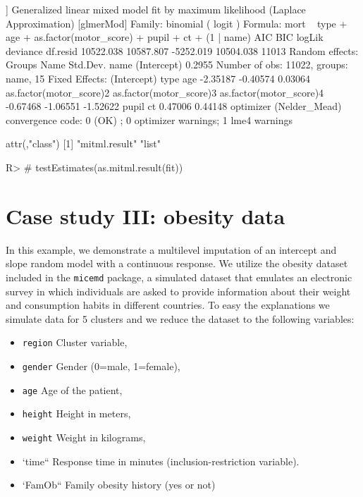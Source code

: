 \documentclass[
]{jss}
\providecommand{\tightlist}{%
  \setlength{\itemsep}{0pt}\setlength{\parskip}{0pt}}
\begin{document}
\begin{CodeChunk}
\begin{CodeOutput}
[[5]]
Generalized linear mixed model fit by maximum likelihood (Laplace
  Approximation) [glmerMod]
 Family: binomial  ( logit )
Formula: mort ~ type + age + as.factor(motor_score) + pupil + ct + (1 |  
    name)
      AIC       BIC    logLik  deviance  df.resid 
10522.038 10587.807 -5252.019 10504.038     11013 
Random effects:
 Groups Name        Std.Dev.
 name   (Intercept) 0.2955  
Number of obs: 11022, groups:  name, 15
Fixed Effects:
            (Intercept)                     type                      age  
               -2.35187                 -0.40574                  0.03064  
as.factor(motor_score)2  as.factor(motor_score)3  as.factor(motor_score)4  
               -0.67468                 -1.06551                 -1.52622  
                  pupil                       ct  
                0.47006                  0.44148  
optimizer (Nelder_Mead) convergence code: 0 (OK) ; 0 optimizer warnings; 1 lme4 warnings 

attr(,"class")
[1] "mitml.result" "list"        
\end{CodeOutput}
\begin{CodeInput}
R> # testEstimates(as.mitml.result(fit))
\end{CodeInput}
\end{CodeChunk}

\hypertarget{case-study-iii-obesity-data}{%
\section{Case study III: obesity
data}\label{case-study-iii-obesity-data}}

In this example, we demonstrate a multilevel imputation of an intercept
and slope random model with a continuous response. We utilize the
obesity dataset included in the \texttt{micemd} package, a simulated
dataset that emulates an electronic survey in which individuals are
asked to provide information about their weight and consumption habits
in different countries. To easy the explanations we simulate data for 5
clusters and we reduce the dataset to the following variables:

\begin{itemize}
\tightlist
\item
  \texttt{region} Cluster variable,
\item
  \texttt{gender} Gender (0=male, 1=female),
\item
  \texttt{age} Age of the patient,
\item
  \texttt{height} Height in meters,
\item
  \texttt{weight} Weight in kilograms,
\item
  `time`` Response time in minutes (inclusion-restriction variable).
\item
  `FamOb`` Family obesity history (yes or not)
\end{itemize}
\end{document}
